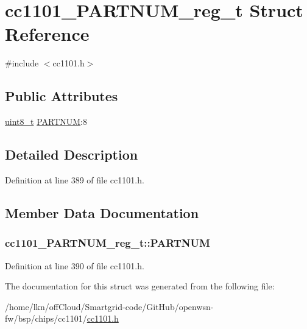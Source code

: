 \hypertarget{structcc1101___p_a_r_t_n_u_m__reg__t}{}\section{cc1101\+\_\+\+P\+A\+R\+T\+N\+U\+M\+\_\+reg\+\_\+t Struct Reference}
\label{structcc1101___p_a_r_t_n_u_m__reg__t}


{\ttfamily \#include $<$cc1101.\+h$>$}

\subsection*{Public Attributes}
\begin{DoxyCompactItemize}
\item 
\hyperlink{_p_e___types_8h_aba7bc1797add20fe3efdf37ced1182c5}{uint8\+\_\+t} \hyperlink{structcc1101___p_a_r_t_n_u_m__reg__t_a1b83da51a22b391f8fddb4d960a7950e}{P\+A\+R\+T\+N\+UM}\+:8
\end{DoxyCompactItemize}


\subsection{Detailed Description}


Definition at line 389 of file cc1101.\+h.



\subsection{Member Data Documentation}
\subsubsection[{\texorpdfstring{P\+A\+R\+T\+N\+UM}{PARTNUM}}]{ cc1101\+\_\+\+P\+A\+R\+T\+N\+U\+M\+\_\+reg\+\_\+t\+::\+P\+A\+R\+T\+N\+UM}\hypertarget{structcc1101___p_a_r_t_n_u_m__reg__t_a1b83da51a22b391f8fddb4d960a7950e}{}\label{structcc1101___p_a_r_t_n_u_m__reg__t_a1b83da51a22b391f8fddb4d960a7950e}


Definition at line 390 of file cc1101.\+h.



The documentation for this struct was generated from the following file\+:\begin{DoxyCompactItemize}
\item 
/home/lkn/off\+Cloud/\+Smartgrid-\/code/\+Git\+Hub/openwsn-\/fw/bsp/chips/cc1101/\hyperlink{cc1101_8h}{cc1101.\+h}\end{DoxyCompactItemize}
